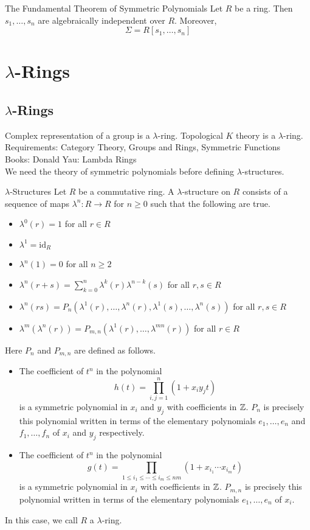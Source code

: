 \documentclass[a4paper]{article}
\begin{document}
\begin{thm}{The Fundamental Theorem of Symmetric Polynomials}{} Let $R$ be a ring. Then $s_1,\dots,s_n$ are algebraically independent over $R$. Moreover, $$\Sigma=R[s_1,\dots,s_n]$$
\end{thm}

\pagebreak
\section{$\lambda$-Rings}
\subsection{$\lambda$-Rings}
Complex representation of a group is a $\lambda$-ring. Topological $K$ theory is a $\lambda$-ring. \\

Requirements: Category Theory, Groups and Rings, Symmetric Functions\\
Books: Donald Yau: Lambda Rings\\

We need the theory of symmetric polynomials before defining $\lambda$-structures. 

\begin{defn}{$\lambda$-Structures}{} Let $R$ be a commutative ring. A $\lambda$-structure on $R$ consists of a sequence of maps $\lambda^n:R\to R$ for $n\geq 0$ such that the following are true. 
\begin{itemize}
\item $\lambda^0(r)=1$ for all $r\in R$
\item $\lambda^1=\text{id}_R$
\item $\lambda^n(1)=0$ for all $n\geq 2$
\item $\lambda^n(r+s)=\sum_{k=0}^n\lambda^k(r)\lambda^{n-k}(s)$ for all $r,s\in R$
\item $\lambda^n(rs)=P_n(\lambda^1(r),\dots,\lambda^n(r),\lambda^1(s),\dots,\lambda^n(s))$ for all $r,s\in R$
\item $\lambda^m(\lambda^n(r))=P_{m,n}(\lambda^1(r),\dots,\lambda^{mn}(r))$ for all $r\in R$
\end{itemize}
Here $P_n$ and $P_{m,n}$ are defined as follows. 
\begin{itemize}
\item The coefficient of $t^n$ in the polynomial $$h(t)=\prod_{i,j=1}^n(1+x_iy_jt)$$ is a symmetric polynomial in $x_i$ and $y_j$ with coefficients in $\mathbb{Z}$. $P_n$ is precisely this polynomial written in terms of the elementary polynomials $e_1,\dots,e_n$ and $f_1,\dots,f_n$ of $x_i$ and $y_j$ respectively. 
\item The coefficient of $t^n$ in the polynomial $$g(t)=\prod_{1\leq i_1\leq\cdots\leq i_m\leq nm}(1+x_{i_1}\cdots x_{i_m}t)$$ is a symmetric polynomial in $x_i$ with coefficients in $\mathbb{Z}$. $P_{m,n}$ is precisely this polynomial written in terms of the elementary polynomials $e_1,\dots,e_n$ of $x_i$. 
\end{itemize}
In this case, we call $R$ a $\lambda$-ring. 
\end{defn}
\end{document}
